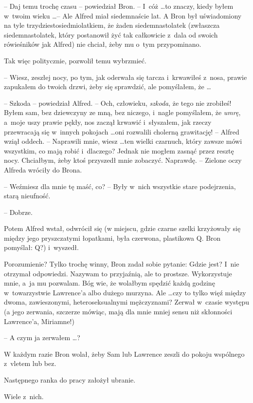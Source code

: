 \documentclass[oneside,polish,11pt,rmheadings]{mwbk}
\begin{document}
-- Daj temu trochę czasu -- powiedział Bron. -- I~cóż \ldots   to znaczy, kiedy byłem w~twoim wieku \ldots  -- Ale Alfred miał siedemnaście lat. A Bron był uświadomiony na tyle trzydziestosiedmiolatkiem, że żaden siedemnastolatek (zwłaszcza siedemnastolatek, który postanowił żyć tak całkowicie z~dala od swoich rówieśników jak Alfred) nie chciał, żeby mu o~tym przypominano. 

Tak więc politycznie, pozwolił temu wybrzmieć.  

-- Wiesz, zeszłej nocy, po tym, jak oderwała się tarcza i~krwawiłeś z~nosa, prawie zapukałem do twoich drzwi, żeby się sprawdzić, ale pomyślałem, że \ldots  

-- Szkoda -- powiedział Alfred. -- Och, człowieku, \textit{szkoda}, że tego nie zrobiłeś! Byłem sam, bez dziewczyny ze mną, bez niczego, i~nagle pomyślałem, że \textit{umrę}, a~moje uszy prawie pękły, nos zaczął krwawić i~słyszałem, jak rzeczy przewracają się w~innych pokojach \ldots  oni rozwalili cholerną grawitację! -- Alfred wziął oddech. -- Naprawili mnie, wiesz \ldots  ten wielki czarnuch, który zawsze mówi wszystkim, co mają robić i~dlaczego? Jednak nie mogłem zasnąć przez resztę nocy.  Chciałbym, żeby ktoś przyszedł mnie zobaczyć. Naprawdę. -- Zielone oczy Alfreda wróciły do Brona. 

-- Weźmiesz dla mnie tę maść, co? -- Były w~nich wszystkie stare podejrzenia, starą nieufność. 

-- Dobrze. 

Potem Alfred wstał, odwrócił się (w miejscu, gdzie czarne szelki krzyżowały się między jego pryszczatymi łopatkami, była czerwona, plastikowa Q. Bron pomyślał: Q?) i~wyszedł. 

Porozumienie? Tylko trochę winny, Bron zadał sobie pytanie: Gdzie jest? I~nie otrzymał odpowiedzi. Nazywam to przyjaźnią, ale to prostsze. Wykorzystuje mnie, a~ja mu pozwalam. Bóg wie, że wolałbym spędzić każdą godzinę w~towarzystwie Lawrence'a albo dużego murzyna. Ale \ldots  czy to tylko więź między dwoma, zawieszonymi, heteroseksualnymi mężczyznami? Zerwał w~czasie występu (a jego zerwania, szczerze mówiąc, mają dla mnie mniej sensu niż skłonności Lawrence'a, Miriamne!)  

-- A czym ja zerwałem  \ldots ? 

W każdym razie Bron wolał, żeby Sam lub Lawrence zeszli do pokoju wspólnego z~vletem lub bez. 

Następnego ranka do pracy założył ubranie. 

Wiele z~nich. 
\end{document}
